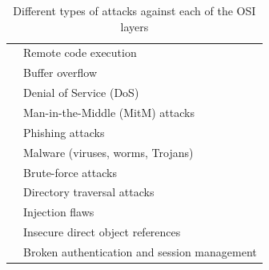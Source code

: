 \begin{table}[h!]
\begin{tabular}{|c|l|}
 & Remote code execution \\
 & Buffer overflow \\
 & Denial of Service (DoS) \\
 & Man-in-the-Middle (MitM) attacks \\
 & Phishing attacks \\
 & Malware (viruses, worms, Trojans) \\
 & Brute-force attacks \\
 & Directory traversal attacks \\
 & Injection flaws \\
 & Insecure direct object references \\
 & Broken authentication and session management \\
\hline
\end{tabular}
\caption{Different types of attacks against each of the OSI layers}
\label{tab:osi-layer-attacks}
\end{table}